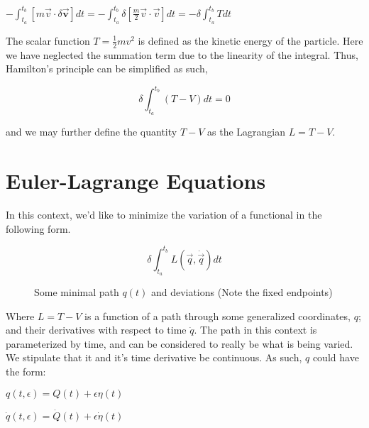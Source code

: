 \documentclass{article}\usepackage[]{graphicx}\usepackage[]{color}
\begin{document}
\begin{center}

$-\int_{t_a}^{t_b}[m\vec{v}\cdot\delta\vec{\textbf{v}}]dt=-\int_{t_a}^{t_b}\delta\left[ \frac{m}{2}\vec{v}\cdot\vec{v}\right] dt
=-\delta\int_{t_a}^{t_b}Tdt$

\end{center}

The scalar function $T=\frac{1}{2}mv^2$ is defined as the kinetic energy of the particle. Here we have neglected the summation term due to the linearity of the integral. Thus, Hamilton's principle can be simplified as such,

\begin{equation}
\delta\int_{t_a}^{t_b}(T-V)dt=0
\end{equation}

and we may further define the quantity $T-V$ as the Lagrangian $L=T-V$.

\section{Euler-Lagrange Equations}

In this context, we'd like to minimize the variation of a functional in the following form.

\begin{equation}
\delta\int^{t_b}_{t_a}L(\vec{q},\dot{\vec{q}})dt 
\end{equation}   

\begin{center}

\begin{figure}\centering

\caption{Some minimal path $q(t)$ and deviations (Note the fixed endpoints)}
\end{figure}

\end{center}

Where $L=T-V$ is a function of a path through some generalized coordinates, $q$; and their derivatives with respect to time $\dot{q}$. The path in this context is parameterized by time, and can be considered to really be what is being varied. We stipulate that it and it's time derivative be continuous. As such, $q$ could have the form:

\begin{center}
$q(t,\epsilon)=Q(t)+\epsilon\eta(t)$

$\dot{q}(t,\epsilon)=\dot{Q}(t)+\epsilon\dot{\eta}(t)$


\end{center}
\end{document}
